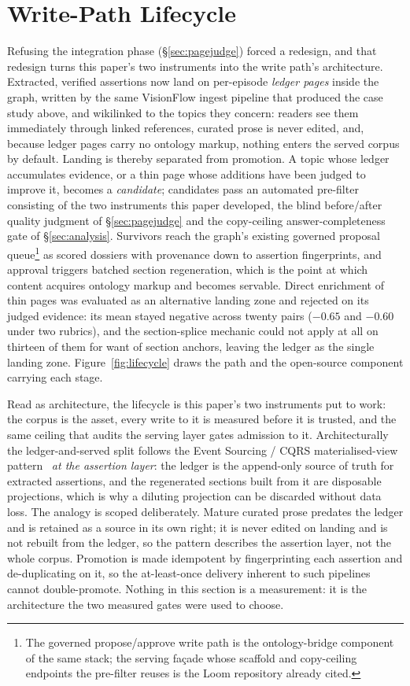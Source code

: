 \documentclass[10pt,twocolumn]{article}
\begin{document}
\section{Write-Path Lifecycle}\label{sec:lifecycle}
Refusing the integration phase (\S\ref{sec:pagejudge}) forced a redesign, and that redesign turns this paper's two
instruments into the write path's architecture. Extracted, verified assertions now land on
per-episode \emph{ledger pages} inside the graph, written by the same VisionFlow ingest pipeline
that produced the case study above, and wikilinked to the topics they concern: readers see them
immediately through linked references, curated prose is never edited, and, because ledger pages
carry no ontology markup, nothing enters the served corpus by default. Landing is thereby separated
from promotion. A topic whose ledger accumulates evidence, or a thin page whose additions have been
judged to improve it, becomes a \emph{candidate}; candidates pass an automated pre-filter consisting
of the two instruments this paper developed, the blind before/after quality judgment of
\S\ref{sec:pagejudge} and the copy-ceiling answer-completeness gate of \S\ref{sec:analysis}.
Survivors reach the graph's existing governed proposal queue\footnote{The governed propose/approve
write path is the ontology-bridge component of the same stack; the serving fa\c{c}ade whose scaffold
and copy-ceiling endpoints the pre-filter reuses is the Loom repository already cited.} as scored
dossiers with provenance down to assertion fingerprints, and approval triggers batched section
regeneration, which is the point at which content acquires ontology markup and becomes servable.
Direct enrichment of thin pages was evaluated as an alternative landing zone and rejected on its
judged evidence: its mean stayed negative across twenty pairs ($-0.65$ and $-0.60$ under two
rubrics), and the section-splice mechanic could not apply at all on thirteen of them for want of
section anchors, leaving the ledger as the single landing zone. Figure~\ref{fig:lifecycle} draws the
path and the open-source component carrying each stage.

Read as architecture, the lifecycle is this paper's two instruments put to work: the corpus is the asset, every
write to it is measured before it is trusted, and the same ceiling that audits the serving layer
gates admission to it. Architecturally the ledger-and-served split follows the Event
Sourcing / CQRS materialised-view pattern~\cite{fowler2005eventsourcing} \emph{at the assertion
layer}: the ledger is the append-only source of truth for extracted assertions, and the regenerated
sections built from it are disposable projections, which is why a diluting projection can be
discarded without data loss. The analogy is scoped deliberately. Mature curated prose predates the
ledger and is retained as a source in its own right; it is never edited on landing and is not
rebuilt from the ledger, so the pattern describes the assertion layer, not the whole corpus.
Promotion is made idempotent by fingerprinting each assertion and de-duplicating on it, so the
at-least-once delivery inherent to such pipelines cannot double-promote. Nothing in this section is
a measurement: it is the architecture the two measured gates were used to choose.
\end{document}
